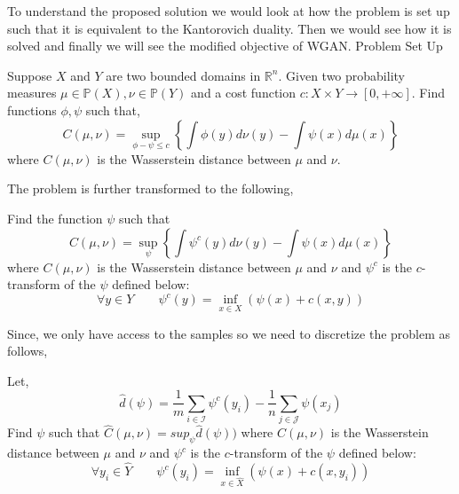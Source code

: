 To understand the proposed solution we would look at how the problem is set up such that it is equivalent to the Kantorovich duality. Then we would see how it is solved and finally we will see the modified objective of WGAN.
Problem Set Up
\begin{prob}
\label{prob:1}
Suppose $X$ and $Y$ are two bounded domains in $\mathbb{R}^n$. Given two probability measures $\mu \in \mathbb{P}(X), \nu \in \mathbb{P}(Y)$ and a cost function $c: X \times Y \rightarrow [0, +\infty]$. Find functions $\phi, \psi$ such that,
$$
C(\mu, \nu)=\sup _{\phi-\psi \leq c}\left\{\int \phi(y) d \nu(y)-\int \psi(x) d \mu(x)\right\}
$$
where $C(\mu, \nu)$ is the Wasserstein distance between $\mu$ and $\nu$.
\end{prob}
The problem is further transformed to the following,
\begin{prob}
\label{prob:2}
Find the function $\psi$ such that
$$
C(\mu, \nu)=\sup _{\psi}\left\{\int \psi^{c}(y) d \nu(y)-\int \psi(x) d \mu(x)\right\}
$$
where $C(\mu, \nu)$ is the Wasserstein distance between $\mu$ and $\nu$ and $\psi^c$ is the $c$-transform of the $\psi$ defined below:
$$
\forall y \in Y \qquad \psi^{c}(y)=\inf _{x \in X}(\psi(x)+c(x, y))
$$
\end{prob}{}
Since, we only have access to the samples so we need to discretize the problem as follows,
\begin{prob} Let,
\label{prob:3}
$$
\hat{d}(\psi)=\frac{1}{m} \sum_{i \in \mathcal{I}} \psi^{c}\left(y_{i}\right)-\frac{1}{n} \sum_{j \in \mathcal{J}} \psi\left(x_{j}\right)
$$
Find $\psi$ such that $\hat{C}(\mu, \nu) = sup_{\psi}\hat{d}(\psi))$ where $C(\mu, \nu)$ is the Wasserstein distance between $\mu$ and $\nu$ and $\psi^c$ is the $c$-transform of the $\psi$ defined below:
$$
\forall y_{i} \in \hat{Y} \qquad \psi^{c}\left(y_{i}\right)=\inf _{x \in \hat{X}}\left(\psi(x)+c\left(x, y_{i}\right)\right)
$$
\end{prob}

